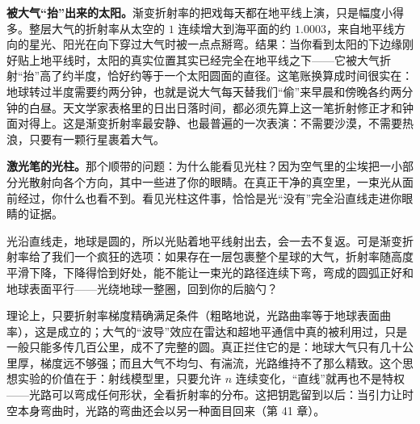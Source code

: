 \textbf{被大气“抬”出来的太阳。}渐变折射率的把戏每天都在地平线上演，只是幅度小得多。整层大气的折射率从太空的 \(1\) 连续增大到海平面的约 \(1.0003\)，来自地平线方向的星光、阳光在向下穿过大气时被一点点掰弯。结果：当你看到太阳的下边缘刚好贴上地平线时，太阳的真实位置其实已经完全在地平线之下——它被大气折射“抬”高了约半度，恰好约等于一个太阳圆面的直径。这笔账换算成时间很实在：地球转过半度需要约两分钟，也就是说大气每天替我们“偷”来早晨和傍晚各约两分钟的白昼。天文学家表格里的日出日落时间，都必须先算上这一笔折射修正才和钟面对得上。这是渐变折射率最安静、也最普遍的一次表演：不需要沙漠，不需要热浪，只要有一颗行星裹着大气。

\begin{center}
\end{center}

\textbf{激光笔的光柱。}那个顺带的问题：为什么能看见光柱？因为空气里的尘埃把一小部分光散射向各个方向，其中一些进了你的眼睛。在真正干净的真空里，一束光从面前经过，你什么也看不到。看见光柱这件事，恰恰是光“没有”完全沿直线走进你眼睛的证据。


\begin{thought}[让光绕地球一圈]
光沿直线走，地球是圆的，所以光贴着地平线射出去，会一去不复返。可是渐变折射率给了我们一个疯狂的选项：如果存在一层包裹整个星球的大气，折射率随高度平滑下降，下降得恰到好处，能不能让一束光的路径连续下弯，弯成的圆弧正好和地球表面平行——光绕地球一整圈，回到你的后脑勺？

理论上，只要折射率梯度精确满足条件（粗略地说，光路曲率等于地球表面曲率），这是成立的；大气的“波导”效应在雷达和超地平通信中真的被利用过，只是一般只能多传几百公里，成不了完整的圆。真正拦住它的是：地球大气只有几十公里厚，梯度远不够强；而且大气不均匀、有湍流，光路维持不了那么精致。这个思想实验的价值在于：射线模型里，只要允许 \(n\) 连续变化，“直线”就再也不是特权——光路可以弯成任何形状，全看折射率的分布。这把钥匙留到以后：当引力让时空本身弯曲时，光路的弯曲还会以另一种面目回来（第 41 章）。
\end{thought}

